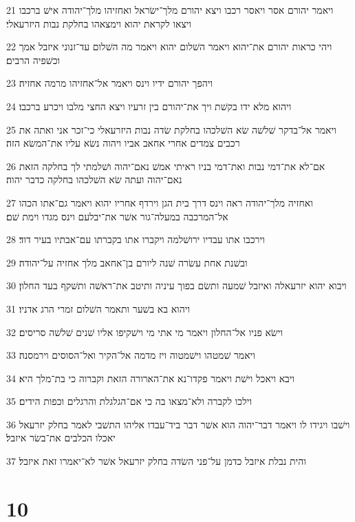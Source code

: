 \par 21 ויאמר יהורם אסר ויאסר רכבו ויצא יהורם מלך־ישׂראל ואחזיהו מלך־יהודה אישׁ ברכבו ויצאו לקראת יהוא וימצאהו בחלקת נבות היזרעאלי׃
\par 22 ויהי כראות יהורם את־יהוא ויאמר השׁלום יהוא ויאמר מה השׁלום עד־זנוני איזבל אמך וכשׁפיה הרבים׃
\par 23 ויהפך יהורם ידיו וינס ויאמר אל־אחזיהו מרמה אחזיה׃
\par 24 ויהוא מלא ידו בקשׁת ויך את־יהורם בין זרעיו ויצא החצי מלבו ויכרע ברכבו׃
\par 25 ויאמר אל־בדקר שׁלשׁה שׂא השׁלכהו בחלקת שׂדה נבות היזרעאלי כי־זכר אני ואתה את רכבים צמדים אחרי אחאב אביו ויהוה נשׂא עליו את־המשׂא הזה׃
\par 26 אם־לא את־דמי נבות ואת־דמי בניו ראיתי אמשׁ נאם־יהוה ושׁלמתי לך בחלקה הזאת נאם־יהוה ועתה שׂא השׁלכהו בחלקה כדבר יהוה׃
\par 27 ואחזיה מלך־יהודה ראה וינס דרך בית הגן וירדף אחריו יהוא ויאמר גם־אתו הכהו אל־המרכבה במעלה־גור אשׁר את־יבלעם וינס מגדו וימת שׁם׃
\par 28 וירכבו אתו עבדיו ירושׁלמה ויקברו אתו בקברתו עם־אבתיו בעיר דוד׃
\par 29 ובשׁנת אחת עשׂרה שׁנה ליורם בן־אחאב מלך אחזיה על־יהודה׃
\par 30 ויבוא יהוא יזרעאלה ואיזבל שׁמעה ותשׂם בפוך עיניה ותיטב את־ראשׁה ותשׁקף בעד החלון׃
\par 31 ויהוא בא בשׁער ותאמר השׁלום זמרי הרג אדניו׃
\par 32 וישׂא פניו אל־החלון ויאמר מי אתי מי וישׁקיפו אליו שׁנים שׁלשׁה סריסים׃
\par 33 ויאמר שׁמטהו וישׁמטוה ויז מדמה אל־הקיר ואל־הסוסים וירמסנה׃
\par 34 ויבא ויאכל וישׁת ויאמר פקדו־נא את־הארורה הזאת וקברוה כי בת־מלך היא׃
\par 35 וילכו לקברה ולא־מצאו בה כי אם־הגלגלת והרגלים וכפות הידים׃
\par 36 וישׁבו ויגידו לו ויאמר דבר־יהוה הוא אשׁר דבר ביד־עבדו אליהו התשׁבי לאמר בחלק יזרעאל יאכלו הכלבים את־בשׂר איזבל׃
\par 37 והית נבלת איזבל כדמן על־פני השׂדה בחלק יזרעאל אשׁר לא־יאמרו זאת איזבל׃

\chapter{10}

